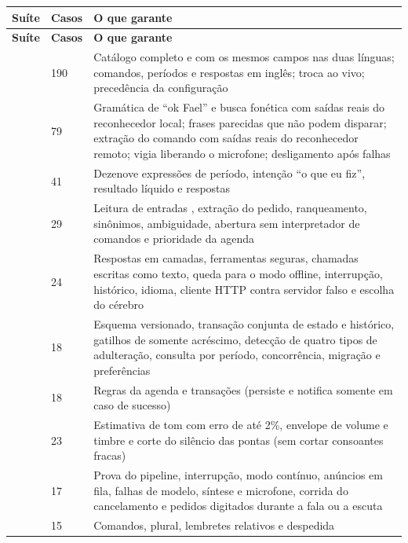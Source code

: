 \begin{singlespace}
\label{qua:suites}
\small
\begin{tabularx}{\textwidth}{|P{4.2cm}|C{1.3cm}|L|}
\hline
\textbf{Suíte} & \textbf{Casos} & \textbf{O que garante} \\ \hline
\endfirsthead
\hline
\textbf{Suíte} & \textbf{Casos} & \textbf{O que garante} \\ \hline
\endhead
{} & 190 & Catálogo completo e com os mesmos campos nas duas línguas; comandos, períodos e respostas em inglês; troca ao vivo; precedência da configuração \\ \hline
{} & 79 & Gramática de “ok Fael” e busca fonética com saídas reais do reconhecedor local; frases parecidas que não podem disparar; extração do comando com saídas reais do reconhecedor remoto; vigia liberando o microfone; desligamento após falhas \\ \hline
{} & 41 & Dezenove expressões de período, intenção “o que eu fiz”, resultado líquido e respostas \\ \hline
{} & 29 & Leitura de entradas , extração do pedido, ranqueamento, sinônimos, ambiguidade, abertura sem interpretador de comandos e prioridade da agenda \\ \hline
{} & 24 & Respostas em camadas, ferramentas seguras, chamadas escritas como texto, queda para o modo offline, interrupção, histórico, idioma, cliente HTTP contra servidor falso e escolha do cérebro \\ \hline
{} & 18 & Esquema versionado, transação conjunta de estado e histórico, gatilhos de somente acréscimo, detecção de quatro tipos de adulteração, consulta por período, concorrência, migração e preferências \\ \hline
{} & 18 & Regras da agenda e transações (persiste e notifica somente em caso de sucesso) \\ \hline
{} & 23 & Estimativa de tom com erro de até 2\%, envelope de volume e timbre e corte do silêncio das pontas (sem cortar consoantes fracas) \\ \hline
{} & 17 & Prova do pipeline, interrupção, modo contínuo, anúncios em fila, falhas de modelo, síntese e microfone, corrida do cancelamento e pedidos digitados durante a fala ou a escuta \\ \hline
{} & 15 & Comandos, plural, lembretes relativos e despedida \\ \hline

\end{tabularx}
\end{singlespace}
